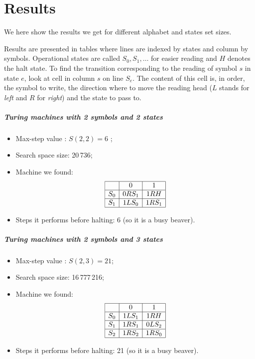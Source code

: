 \documentclass{report}
\begin{document}
\chapter{Results}
\label{chap:results}

We here show the results we get for different alphabet and states set sizes.

Results are presented in tables where lines are indexed by states and column by symbols. Operational states are called $S_0, S_1, \dots$ for easier reading and $H$ denotes the halt state. To find the transition corresponding to the reading of symbol $s$ in state $e$, look at cell in column $s$ on line $S_e$. The content of this cell is, in order, the symbol to write, the direction where to move the reading head ($L$ stands for \emph{left} and $R$ for \emph{right}) and the state to pass to.

\paragraph{Turing machines with 2 symbols and 2 states}

\begin{itemize}
\item Max-step value \cite{rado}: $S(2,2) = 6$ ;
\item Search space size: 20\,736;
\item Machine we found:
\[
\begin{array}[h]{|c|c|c|}
\hline
   &0     &1\\
\hline
S_0& 0RS_1& 1RH\\
\hline
S_1& 1LS_0& 1RS_1\\
\hline
\end{array}
\]
\item Steps it performs before halting: 6 (so it is a busy beaver).
\end{itemize}

\paragraph{Turing machines with 2 symbols and 3 states}

\begin{itemize}
\item Max-step value \cite{rado}: $S(2,3) = 21$;
\item Search space size: 16\,777\,216;
\item Machine we found:
\[
\begin{array}[h]{|c|c|c|c|}
\hline
   & 0    &1\\
\hline
S_0& 1LS_1& 1RH\\
\hline
S_1& 1RS_1& 0LS_2\\
\hline
S_2& 1RS_2& 1RS_0\\
\hline
\end{array}
\]
\item Steps it performs before halting: 21 (so it is a busy beaver).
\end{itemize}
\end{document}
